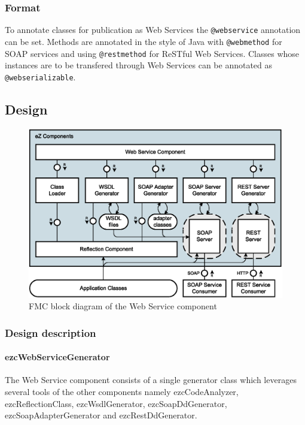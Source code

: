 \documentclass[10pt,final,a4paper,oneside]{article}
\begin{document}
\subsubsection{Format}
To annotate classes for publication as Web Services
the \verb|@webservice| annotation can be set.
Methods are annotated in the style of Java
with \verb|@webmethod| for SOAP services
and using \verb|@restmethod| for ReSTful Web Services.
Classes whose instances are to be transfered
through Web Services can be annotated as \verb|@webserializable|.


\subsection{Design}\label{subsec:WebServiceDesign}
%
%

\begin{figure}[htbp]
	\centering
		\includegraphics[width=1.00\textwidth]{figures/ezcWebService.block-diagram.eps}
	\caption{FMC block diagram of the Web Service component}
	\label{fig:ezcWebService.block-diagram}
\end{figure}

\subsubsection{Design description}

\paragraph{ezcWebServiceGenerator}
The Web Service component consists of a single generator class
which leverages several tools of the other components namely
ezcCodeAnalyzer, ezcReflectionClass, ezcWsdlGenerator, ezcSoapDdGenerator,
ezcSoapAdapterGenerator and ezcRestDdGenerator.
\end{document}
